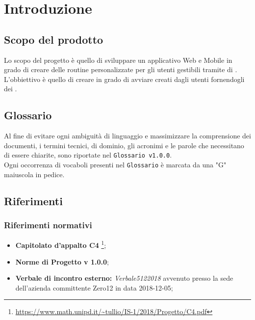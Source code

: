 \chapter{Introduzione}

\section{Scopo del prodotto}
Lo scopo del progetto è quello di sviluppare un applicativo Web e Mobile in grado di creare delle routine personalizzate per gli utenti gestibili tramite  di . L'obbiettivo è quello di creare  in grado di avviare  creati dagli utenti fornendogli dei .
\section{Glossario}
Al fine di evitare ogni ambiguità di linguaggio e massimizzare la comprensione dei documenti, i termini tecnici, di dominio, gli acronimi e le parole che necessitano di essere chiarite, sono riportate nel \texttt{Glossario v1.0.0}.\\
Ogni occorrenza di vocaboli presenti nel \texttt{Glossario} è marcata da una "G" maiuscola in pedice.

\section{Riferimenti}

\subsection{Riferimenti normativi}
\begin{itemize}
	
	\item \textbf{Capitolato d'appalto C4} \footnote{\url{https://www.math.unipd.it/~tullio/IS-1/2018/Progetto/C4.pdf}};
	\item \textbf{Norme di Progetto v 1.0.0};
	\item \textbf{Verbale di incontro esterno:} \textit{Verbale5122018} avvenuto presso la sede dell'azienda committente Zero12 in data 2018-12-05;

\end{itemize}


